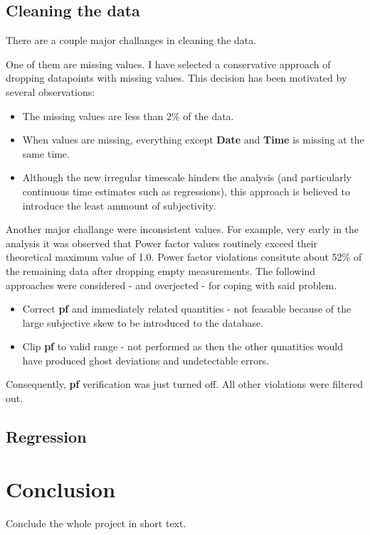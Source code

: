 \documentclass[11pt]{article}
\newcommand{\code}[1]{\textbf{#1}}
\newcommand{\para}[0]{\par\vspace{0.5cm}}
\begin{document}
\subsection{Cleaning the data}
There are a couple major challanges in cleaning the data.
\para
One of them are missing values.
I have selected a conservative approach of dropping datapoints with missing values.
This decision has been motivated by several observations:
\begin{itemize}
    \item{The missing values are less than 2\% of the data.}
    \item{When values are missing, everything except \code{Date} and \code{Time} is missing at the same time.}
    \item{Although the new irregular timescale hinders the analysis (and particularly continuous time estimates such as regressions), this approach is believed to introduce the least ammount of subjectivity.}
\end{itemize}
\para
Another major challange were inconsistent values.
For example, very early in the analysis it was observed that Power factor values routinely exceed their theoretical maximum value of 1.0.
Power factor violations consitute about 52\% of the remaining data after dropping empty measurements.
The followind approaches were considered - and overjected - for coping with said problem.
\begin{itemize}
    \item{Correct \code{pf} and immediately related quantities - not feasable because of the large subjective skew to be introduced to the database.}
    \item{Clip \code{pf} to valid range - not performed as then the other qunatities would have produced ghost deviations and undetectable errors.}
\end{itemize}
Consequently, \code{pf} verification was just turned off.
All other violations were filtered out.


\subsection{Regression}
\section{Conclusion}
Conclude the whole project in short text.


 
\end{document}
